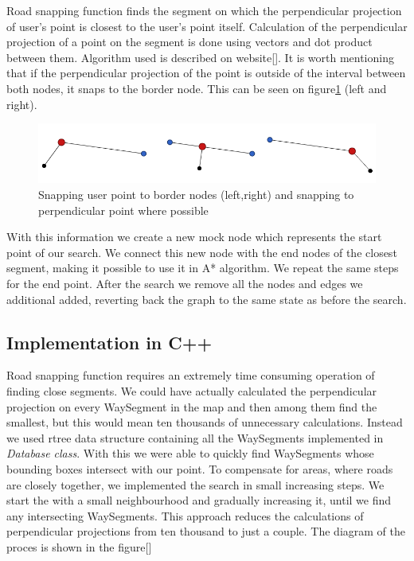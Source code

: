 \documentclass[reqno,openany,12pt]{amsbook}
\theoremstyle{definition}
\theoremstyle{remark}
\begin{document}
Road snapping function finds the segment on which the perpendicular projection of user's point is closest to the user's point itself. Calculation of the perpendicular projection of a point on the segment is done using vectors and dot product between them. Algorithm used is described on website[]. It is worth mentioning that if the perpendicular projection of the point is outside of the interval between both nodes, it snaps to the border node. This can be seen on figure\ref{fig:db_snap} (left and right).

 \begin{figure}[h]
 \centering
 \includegraphics[width=0.8\linewidth]{../photos/snap_points.png}
 \caption{Snapping user point to border nodes (left,right) and snapping to perpendicular point where possible}
 \label{fig:db_snap}
 \end{figure}

 With this information we create a new mock node which represents the start point of our search. We connect this new node with the end nodes of the closest segment, making it possible to use it in A* algorithm. We repeat the same steps for the end point. After the search we remove all the nodes and edges we additional added, reverting back the graph to the same state as before the search.

  \subsection{Implementation in C++}
Road snapping function requires an extremely time consuming operation of finding close segments. We could have actually calculated the perpendicular projection on every WaySegment in the map and then among them find the smallest, but this would mean ten thousands of unnecessary calculations. Instead we used rtree data structure containing all the WaySegments implemented in \textit{Database class}. With this we were able to quickly find WaySegments whose bounding boxes intersect with our point. To compensate for areas, where roads are closely together, we implemented the search in small increasing steps. We start the with a small neighbourhood and gradually increasing it, until we find any intersecting WaySegments. This approach reduces the calculations of perpendicular projections from ten thousand to just a couple. The diagram of the proces is shown in the figure[]
\end{document}
